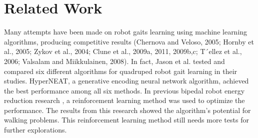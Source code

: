\section{Related Work}

Many attempts have been made on robot gaits learning using machine
learning algorithms, producing competitive results  (Chernova and Veloso, 2005; Hornby et al., 2005;
Zykov et al., 2004; Clune et al., 2009a, 2011, 2009b,c; T´ellez et
al., 2006; Valsalam and Miikkulainen, 2008). In fact, Jason et
al. tested and compared six different algorithms for quadruped robot
gait learning in their studies. HyperNEAT, a generative encoding
neural network algorithm, achieved the best performance among all six
methods. In previous bipedal robot energy reduction
research \citep{kormushev2011bipedal-walking-energy}, a reinforcement learning method was used to optimize the
performance. The results from this research showed the
algorithm's potential for walking problems. This reinforcement
learning method still needs more tests for further explorations.
